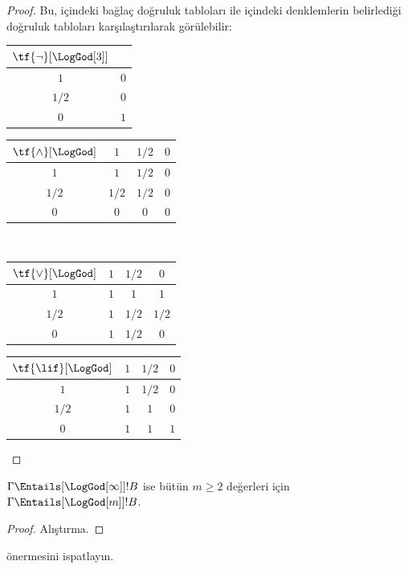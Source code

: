 \begin{proof}
  Bu,  içindeki bağlaç doğruluk tabloları ile
   içindeki denklemlerin belirlediği doğruluk tabloları
  karşılaştırılarak görülebilir:
  \begin{center}
    \begin{tabular}{c|c} 
      $\tf{\lnot}[\LogGod[3]]$ & \\ 
      \hline  
      $1$ & $0$ \\ 
      $1/2$ & $0$ \\
      $0$ & $1$ 
    \end{tabular}
    \quad
    \begin{tabular}{c|ccc} 
      $\tf{\land}[\LogGod]$ & $1$ & $1/2$ & $0$ \\ 
      \hline 
      $1$ & $1$ & $1/2$ & $0$ \\ 
      $1/2$ & $1/2$ & $1/2$ & $0$\\ 
      $0$ & $0$ & $0$ & $0$ 
    \end{tabular}
    \\[2ex]
    \begin{tabular}{c|ccc} 
      $\tf{\lor}[\LogGod]$ & $1$ & $1/2$ & $0$ \\ 
      \hline 
      $1$ & $1$ & $1$ & $1$ \\ 
      $1/2$ & $1$ & $1/2$ & $1/2$ \\
      $0$ & $1$ & $1/2$ & $0$ 
    \end{tabular}
    \quad
    \begin{tabular}{c|ccc} 
      $\tf{\lif}[\LogGod]$ & $1$ & $1/2$ & $0$ \\ 
      \hline 
      $1$ & $1$ & $1/2$ & $0$ \\ 
      $1/2$ & $1$ & $1$ & $0$  \\ 
      $0$ & $1$ & $1$ & $1$ 
    \end{tabular}
  \end{center} 
\end{proof}

\begin{prop}
  $\Gamma \Entails[\LogGod[\infty]] !B$ ise bütün $m \ge 2$ değerleri için
  $\Gamma \Entails[\LogGod[m]] !B$.
\end{prop}

\begin{proof}
  Alıştırma.
\end{proof}

\begin{prob}
   önermesini ispatlayın.
\end{prob}

